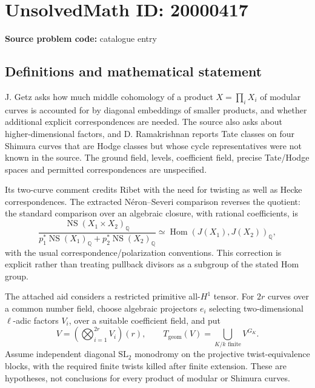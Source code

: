\documentclass[11pt]{article}
\newcommand{\Q}{\mathbb{Q}}
\begin{document}
\section*{UnsolvedMath ID: 20000417}
\textbf{Source problem code:} catalogue entry
\subsection{Definitions and mathematical statement}
J. Getz asks how much middle cohomology of a product \(X=\prod_iX_i\) of modular curves is accounted for by diagonal embeddings of smaller products, and whether additional explicit correspondences are needed. The source also asks about higher-dimensional factors, and D. Ramakrishnan reports Tate classes on four Shimura curves that are Hodge classes but whose cycle representatives were not known in the source. The ground field, levels, coefficient field, precise Tate/Hodge spaces and permitted correspondences are unspecified.

Its two-curve comment credits Ribet with the need for twisting as well as Hecke correspondences. The extracted N\'eron--Severi comparison reverses the quotient: the standard comparison over an algebraic closure, with rational coefficients, is
\[
\frac{\operatorname{NS}(X_1\times X_2)_{\Q}}
{p_1^*\operatorname{NS}(X_1)_{\Q}+p_2^*\operatorname{NS}(X_2)_{\Q}}
\simeq\operatorname{Hom}(J(X_1),J(X_2))_{\Q},
\]
with the usual correspondence/polarization conventions. This correction is explicit rather than treating pullback divisors as a subgroup of the stated Hom group.

The attached aid considers a restricted primitive all-\(H^1\) tensor. For \(2r\) curves over a common number field, choose algebraic projectors \(e_i\) selecting two-dimensional \(\ell\)-adic factors \(V_i\), over a suitable coefficient field, and put
\[
V=(\bigotimes_{i=1}^{2r}V_i)(r),\qquad
T_{\mathrm{geom}}(V)=\bigcup_{K/k\text{ finite}}V^{G_K}.
\]
Assume independent diagonal \(\mathrm{SL}_2\) monodromy on the projective twist-equivalence blocks, with the required finite twists killed after finite extension. These are hypotheses, not conclusions for every product of modular or Shimura curves.
\end{document}
